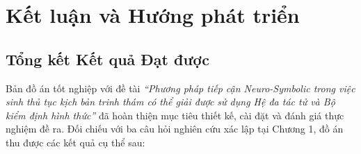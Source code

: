 \chapter{Kết luận và Hướng phát triển}
\label{ch:conclusion}

\section{Tổng kết Kết quả Đạt được}
\label{sec:conclusion_summary}

Bản đồ án tốt nghiệp với đề tài \textit{``Phương pháp tiếp cận Neuro-Symbolic trong việc sinh thủ tục kịch bản trinh thám có thể giải được sử dụng Hệ đa tác tử và Bộ kiểm định hình thức''} đã hoàn thiện mục tiêu thiết kế, cài đặt và đánh giá thực nghiệm đề ra. Đối chiếu với ba câu hỏi nghiên cứu xác lập tại Chương 1, đồ án thu được các kết quả cụ thể sau:

